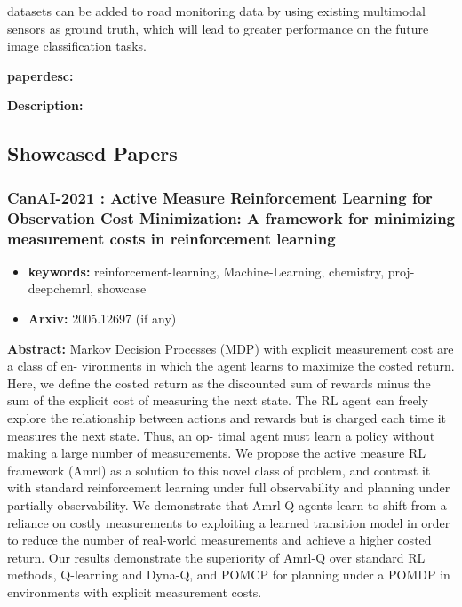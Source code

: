 \documentclass{article}
\begin{document}
datasets can be added to road monitoring data by using existing multimodal sensors as ground truth, which will lead to greater performance on the future image classification tasks.

\textbf{paperdesc:} 

\textbf{Description:} 



\subsection{Showcased Papers}
\newpage
\subsubsection{\textbf{CanAI-2021} : Active Measure Reinforcement Learning for Observation Cost Minimization: A framework for minimizing measurement costs in reinforcement learning}
\begin{itemize}
\item \textbf{keywords:} reinforcement-learning, Machine-Learning, chemistry, proj-deepchemrl, showcase
\item \textbf{Arxiv:} 2005.12697 (if any)
\end{itemize}


\textbf{Abstract:} Markov Decision Processes (MDP) with explicit measurement cost are a class of en- vironments in which the agent learns to maximize the costed return. Here, we define the costed return as the discounted sum of rewards minus the sum of the explicit cost of measuring the next state. The RL agent can freely explore the relationship between actions and rewards but is charged each time it measures the next state. Thus, an op- timal agent must learn a policy without making a large number of measurements. We propose the active measure RL framework (Amrl) as a solution to this novel class of problem, and contrast it with standard reinforcement learning under full observability and planning under partially observability. We demonstrate that Amrl-Q agents learn to shift from a reliance on costly measurements to exploiting a learned transition model in order to reduce the number of real-world measurements and achieve a higher costed return. Our results demonstrate the superiority of Amrl-Q over standard RL methods, Q-learning and Dyna-Q, and POMCP for planning under a POMDP in environments with explicit measurement costs.
\end{document}
